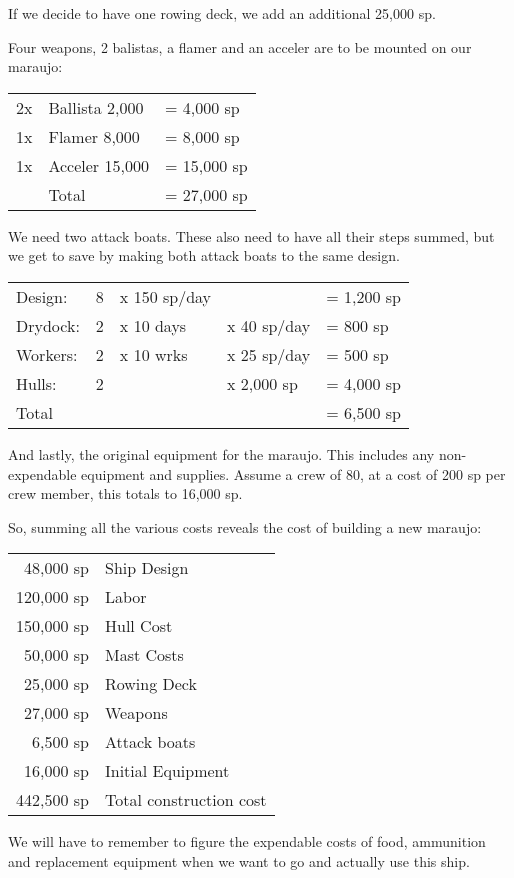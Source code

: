 If we decide to have one rowing deck, we add an additional 25,000 sp.

Four weapons, 2 balistas, a flamer and an acceler are to be mounted on our maraujo:

\begin{tabular}{@{}l l l}
2x & Ballista 2,000 & =  4,000 sp\\
1x & Flamer 8,000 & =  8,000 sp\\
1x & Acceler 15,000 & =  15,000 sp\\
\midrule
 & Total & =  27,000 sp\\
\end{tabular}

We need two attack boats. These also need to have all their steps summed, but we get to save by making both attack boats to the same design.

\begin{tabular}{@{}lllll}
Design: & 8 & x 150 sp/day &  &  = 1,200 sp\\
Drydock: & 2 & x 10 days & x 40 sp/day & = 800 sp\\
Workers: & 2 & x 10 wrks & x 25 sp/day & = 500 sp\\
Hulls: & 2 &  &  x 2,000 sp & = 4,000 sp\\
\midrule
Total &  &  &  &  = 6,500 sp\\
\end{tabular}

And lastly, the original equipment for the maraujo. This includes any non-expendable equipment and supplies. Assume a crew of 80, at a cost of 200 sp per crew member,
this totals to 16,000 sp.

So, summing all the various costs reveals the cost of building a new maraujo:

\begin{tabular}{@{}r l}
48,000 sp & Ship Design\\
120,000 sp & Labor\\
150,000 sp & Hull Cost\\
50,000 sp & Mast Costs\\
25,000 sp & Rowing Deck\\
27,000 sp & Weapons\\
6,500 sp & Attack boats\\
16,000 sp & Initial Equipment\\
442,500 sp & Total construction cost\\
\end{tabular}

We will have to remember to figure the expendable costs of food, ammunition and replacement equipment when we want to go and actually use this ship.
